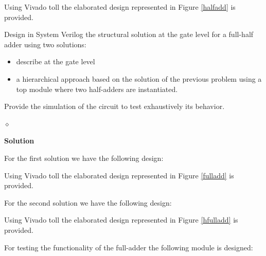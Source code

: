 Using Vivado toll the elaborated design represented in Figure \ref{halfadd} is provided.


\begin{problem}
Design in System Verilog the structural solution at the gate level for a full-half adder using two solutions:
\begin{itemize}
    \item describe at the gate level
    \item a hierarchical approach based on the solution of the previous problem using a top module where two half-adders are instantiated.
\end{itemize}
Provide the simulation of the circuit to test exhaustively its behavior.

$\diamond$
\end{problem}

{\bf Solution}

For the first solution we have the following design:

                    
Using Vivado toll the elaborated design represented in Figure \ref{fulladd} is provided.


For the second solution we have the following design:


Using Vivado toll the elaborated design represented in Figure \ref{hfulladd} is provided.


For testing the functionality of the full-adder the following module is designed:


